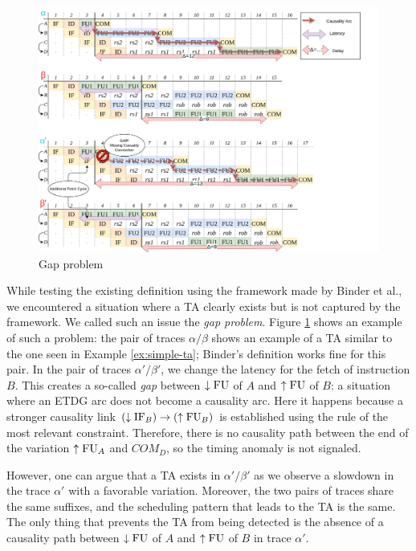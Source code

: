 \begin{figure}[H]
    \centering
    \includegraphics[width=\textwidth]{figures/gap-problem.png}
    \caption{Gap problem}
    \label{fig:gap-problem}
\end{figure}

While testing the existing definition using the framework made by Binder et al., we encountered a situation where a TA clearly exists but is not captured by the framework. We called such an issue the \textit{gap problem}. Figure \ref{fig:gap-problem} shows an example of such a problem: the pair of traces $\alpha/\beta$ shows an example of a TA similar to the one seen in Example \ref{ex:simple-ta}; Binder's definition works fine for this pair. In the pair of traces $\alpha'/\beta'$, we change the latency for the fetch of instruction $B$. This creates a so-called \textit{gap} between $\downarrow\mathrm{FU}$ of $A$ and $\uparrow\mathrm{FU}$ of $B$: a situation where an ETDG arc does not become a causality arc. Here it happens because a stronger causality link $(\downarrow\mathrm{IF}_B) \rightarrow (\uparrow\mathrm{FU}_B)$ is established using the rule of the most relevant constraint. Therefore, there is no causality path between the end of the variation $\uparrow\mathrm{FU}_A$ and $COM_D$, so the timing anomaly is not signaled.

However, one can argue that a TA exists in $\alpha'/\beta'$ as we observe a slowdown in the trace $\alpha'$ with a favorable variation. Moreover, the two pairs of traces share the same suffixes, and the scheduling pattern that leads to the TA is the same. The only thing that prevents the TA from being detected is the absence of a causality path between $\downarrow\mathrm{FU}$ of $A$ and $\uparrow\mathrm{FU}$ of $B$ in trace $\alpha'$.


